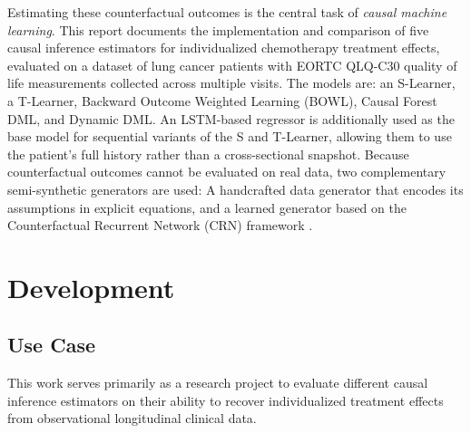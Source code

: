 \documentclass{article}
\begin{document}
Estimating these counterfactual outcomes is the central task of
\emph{causal machine learning}. This report documents the implementation and comparison of five
causal inference estimators for individualized chemotherapy treatment
effects, evaluated on a dataset of lung cancer patients with EORTC
QLQ-C30 quality of life measurements collected across multiple visits.
The models are: an S-Learner, a T-Learner, Backward Outcome
Weighted Learning (BOWL), Causal Forest DML, and Dynamic DML.
An LSTM-based regressor is additionally used as the base model for sequential variants
of the S and T-Learner, allowing them to use the patient's full
history rather than a cross-sectional snapshot. Because
counterfactual outcomes cannot be evaluated on real data, two
complementary semi-synthetic generators are used: A handcrafted
data generator that encodes its assumptions in explicit
equations, and a learned generator based on the Counterfactual
Recurrent Network (CRN) framework
\cite{bica2020estimatingcounterfactualtreatmentoutcomes}.
\section{Development}

\subsection{Use Case}
This work serves primarily as a research project to evaluate different
causal inference estimators on their ability to recover individualized
treatment effects from observational longitudinal clinical data.
\end{document}
